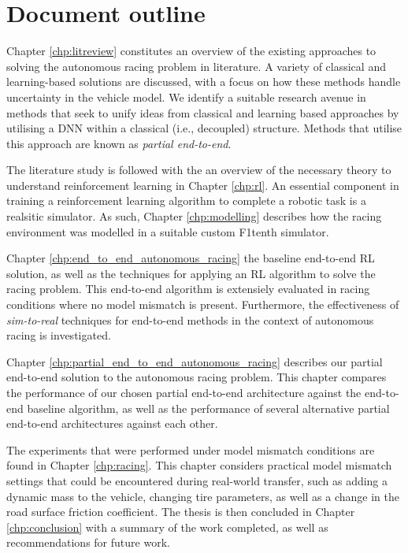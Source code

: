 


\section{Document outline}\label{sec:outline}

Chapter \ref{chp:litreview} constitutes an overview of the existing approaches to solving the autonomous racing problem in literature.
A variety of classical and learning-based solutions are discussed, with a focus on how these methods handle uncertainty in the vehicle model.
We identify a suitable research avenue in methods that seek to unify ideas from classical and learning based approaches by utilising a DNN within a classical (i.e., decoupled) structure.
Methods that utilise this approach are known as \emph{partial end-to-end}.

The literature study is followed with the an overview of the necessary theory to understand reinforcement learning in Chapter \ref{chp:rl}.
An essential component in training a reinforcement learning algorithm to complete a robotic task is a realsitic simulator.
As such, Chapter \ref{chp:modelling} describes how the racing environment was modelled in a suitable custom F1tenth simulator.

Chapter \ref{chp:end_to_end_autonomous_racing} the baseline end-to-end RL solution, as well as the techniques for applying an RL algorithm to solve the racing problem.
This end-to-end algorithm is extensiely evaluated in racing conditions where no model mismatch is present.
Furthermore, the effectiveness of \emph{sim-to-real} techniques for end-to-end methods in the context of autonomous racing is investigated.

Chapter \ref{chp:partial_end_to_end_autonomous_racing} describes our partial end-to-end solution to the autonomous racing problem.
This chapter compares the performance of our chosen partial end-to-end architecture against the end-to-end baseline algorithm, 
as well as the performance of several alternative partial end-to-end architectures against each other.

The experiments that were performed under model mismatch conditions are found in Chapter \ref{chp:racing}.
This chapter considers practical model mismatch settings that could be encountered during real-world transfer, such as adding a dynamic mass to the vehicle, 
changing tire parameters, as well as a change in the road surface friction coefficient.
The thesis is then concluded in Chapter \ref{chp:conclusion} with a summary of the work completed, as well as recommendations for future work.
